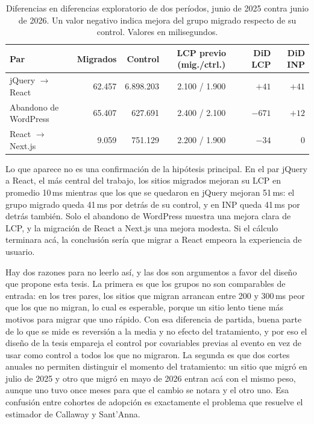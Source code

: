 \documentclass[12pt, a4paper]{article}
\begin{document}
\begin{table}[H]
\centering
\small
\caption{Diferencias en diferencias exploratorio de dos períodos, junio de 2025 contra junio de 2026. Un valor negativo indica mejora del grupo migrado respecto de su control. Valores en milisegundos.}
\label{tab:exploratorio}
\begin{tabular}{|p{3.3cm}|r|r|c|r|r|}
\hline
\textbf{Par} & \textbf{Migrados} & \textbf{Control} & \textbf{LCP previo (mig./ctrl.)} & \textbf{DiD LCP} & \textbf{DiD INP} \\ \hline
jQuery $\to$ React        & 62.457 & 6.898.203 & 2.100 / 1.900 & $+41$  & $+41$ \\ \hline
Abandono de WordPress     & 65.407 &   627.691 & 2.400 / 2.100 & $-671$ & $+12$ \\ \hline
React $\to$ Next.js       &  9.059 &   751.129 & 2.200 / 1.900 & $-34$  & $0$   \\ \hline
\end{tabular}
\end{table}

Lo que aparece no es una confirmación de la hipótesis principal. En el par jQuery a React, el más central del trabajo, los sitios migrados mejoran su LCP en promedio 10\,ms mientras que los que se quedaron en jQuery mejoran 51\,ms: el grupo migrado queda 41\,ms por detrás de su control, y en INP queda 41\,ms por detrás también. Solo el abandono de WordPress muestra una mejora clara de LCP, y la migración de React a Next.js una mejora modesta. Si el cálculo terminara acá, la conclusión sería que migrar a React empeora la experiencia de usuario.

Hay dos razones para no leerlo así, y las dos son argumentos a favor del diseño que propone esta tesis. La primera es que los grupos no son comparables de entrada: en los tres pares, los sitios que migran arrancan entre 200 y 300\,ms peor que los que no migran, lo cual es esperable, porque un sitio lento tiene más motivos para migrar que uno rápido. Con esa diferencia de partida, buena parte de lo que se mide es reversión a la media y no efecto del tratamiento, y por eso el diseño de la tesis empareja el control por covariables previas al evento en vez de usar como control a todos los que no migraron. La segunda es que dos cortes anuales no permiten distinguir el momento del tratamiento: un sitio que migró en julio de 2025 y otro que migró en mayo de 2026 entran acá con el mismo peso, aunque uno tuvo once meses para que el cambio se notara y el otro uno. Esa confusión entre cohortes de adopción es exactamente el problema que resuelve el estimador de Callaway y Sant'Anna.
\end{document}

